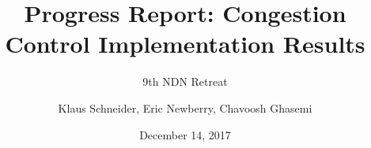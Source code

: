 \documentclass[12pt,nonotes]{beamer}
\author{\footnotesize Klaus Schneider, Eric Newberry, Chavoosh Ghasemi}
\title{Progress Report: Congestion Control Implementation Results}
\subtitle{9th NDN Retreat}
\date{December 14, 2017}
\institute{The University of Arizona}
\begin{document}
\frame{\titlepage}

%

%	
\end{document}
